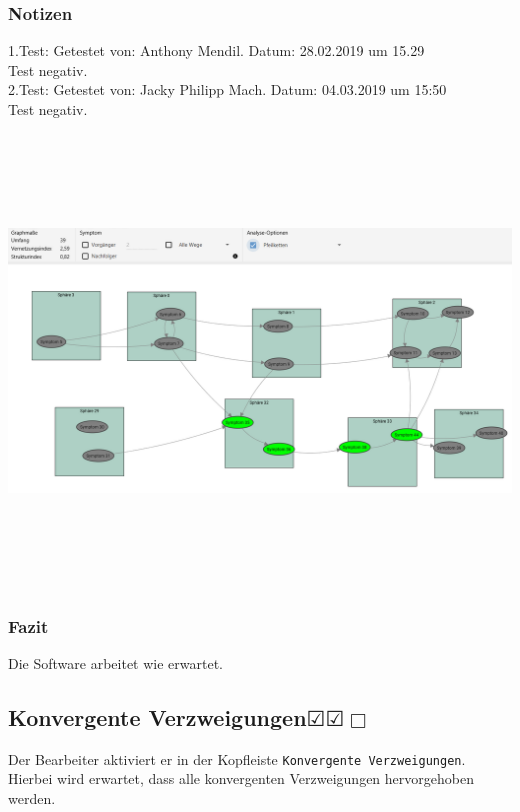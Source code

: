 \documentclass[enabledeprecatedfontcommands]{scrartcl}
\newcommand{\subsectiont}[2]{\subsection[#1]{#1{\normalsize\normalfont #2}}}
\newcommand{\leer}{$\Box$}
\newcommand{\ok}{$\CheckedBox$}
\begin{document}
\subsubsection{Notizen}
1.Test: Getestet von: Anthony Mendil. Datum: 28.02.2019 um 15.29 \\
Test negativ. \\
2.Test: Getestet von: Jacky Philipp Mach. Datum: 04.03.2019 um 15:50 \\
Test negativ.
\begin{center}
\includegraphics[height=12cm, angle=90]{analysepfeilketten.PNG}
\end{center}
\subsubsection{Fazit}
Die Software arbeitet wie erwartet.

\subsectiont{Konvergente Verzweigungen}{\dotfill\ok\ok\leer}
Der Bearbeiter aktiviert er in der Kopfleiste \texttt{Konvergente Verzweigungen}. Hierbei wird erwartet, dass alle konvergenten Verzweigungen hervorgehoben werden. 
\end{document}
